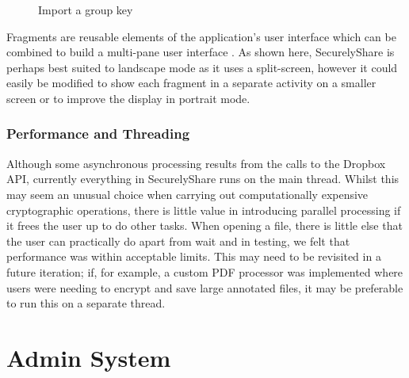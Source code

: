 \begin{figure}[h!]
                                                                                                                                                                                                           
    \caption{Import a group key }
    \label{fig:import}
\end{figure}

Fragments are reusable elements of the application's user interface which can be combined to build a multi-pane user interface \citep{androiddev3}. As shown here, SecurelyShare is perhaps  best suited to landscape mode as it uses a split-screen, however it could easily be modified to show each fragment in a separate activity on a smaller screen or to improve the display in portrait mode.

\subsubsection*{Performance and Threading}
Although some asynchronous processing results from the calls to the Dropbox API, currently everything in SecurelyShare runs on the main thread.  Whilst this may seem an unusual choice when carrying out computationally expensive cryptographic operations, there is little value in introducing parallel processing if it frees the user up to do other tasks.  When opening a file, there is little else that the user can practically do apart from wait and in testing, we felt that performance was within acceptable limits.  This may need to be revisited in a future iteration;  if, for example, a custom PDF processor was implemented where users were needing to encrypt and save large annotated files, it may be preferable to run this on a separate thread.

\section{Admin System}
\\

